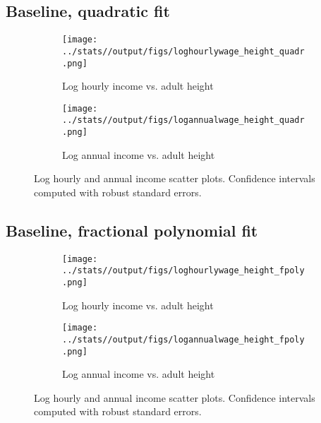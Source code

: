 \subsection{Baseline, quadratic fit}
\begin{figure}[htbp]
	\begin{subfigure}[b]{0.9\textwidth}
		\centering
		\texttt{[image: ../stats//output/figs/loghourlywage\_height\_quadr.png]}	
		\label{fig:loghourlywageheight}
		\caption{Log hourly income vs. adult height}
	\end{subfigure}
	
	\begin{subfigure}[b]{0.9\textwidth}
		\centering
		\texttt{[image: ../stats//output/figs/logannualwage\_height\_quadr.png]}	
		\label{fig:logannualwageheight}
		\caption{Log annual income vs. adult height}
	\end{subfigure}
	\caption{Log hourly and annual income scatter plots. Confidence intervals computed with robust standard errors.}
\end{figure}

\clearpage
\subsection{Baseline, fractional polynomial fit}
\begin{figure}[htbp]
	\begin{subfigure}[b]{0.9\textwidth}
		\centering
		\texttt{[image: ../stats//output/figs/loghourlywage\_height\_fpoly.png]}	
		\label{fig:loghourlywageheight}
		\caption{Log hourly income vs. adult height}
	\end{subfigure}
	
	\begin{subfigure}[b]{0.9\textwidth}
		\centering
		\texttt{[image: ../stats//output/figs/logannualwage\_height\_fpoly.png]}	
		\label{fig:logannualwageheight}
		\caption{Log annual income vs. adult height}
	\end{subfigure}
	\caption{Log hourly and annual income scatter plots. Confidence intervals computed with robust standard errors.}
\end{figure}

\clearpage
